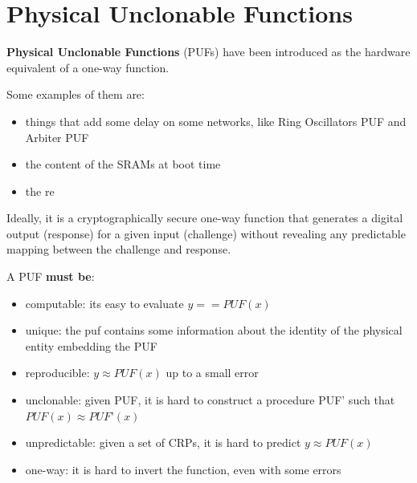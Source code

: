 \chapter{Physical Unclonable Functions}
\label{sec:PUF}

\begin{boxH}
  \textbf{Physical Unclonable Functions} (PUFs) have been introduced as the hardware equivalent of a
  one-way function.
\end{boxH}

Some examples of them are:
\begin{itemize}
  \item things that add some delay on some networks, like Ring Oscillators PUF and Arbiter PUF
  \item the content of the SRAMs at boot time
  \item the re
\end{itemize}
Ideally, it is a cryptographically secure one-way function that generates a digital output
(response) for a given input (challenge) without revealing any predictable mapping between the
challenge and response.

A PUF \textbf{must be}:
\begin{itemize}
  \item computable: its easy to evaluate $y==PUF(x)$
  \item unique: the puf contains some information about the identity of the physical entity
    embedding the PUF
  \item reproducible: $y\approx PUF(x)$ up to a small error
  \item unclonable: given PUF, it is hard to construct a procedure PUF’ such that $PUF(x) \approx
    PUF’(x)$
  \item unpredictable: given a set of CRPs, it is hard to predict $y \approx PUF(x)$
  \item one-way: it is hard to invert the function, even with some errors
\end{itemize}


